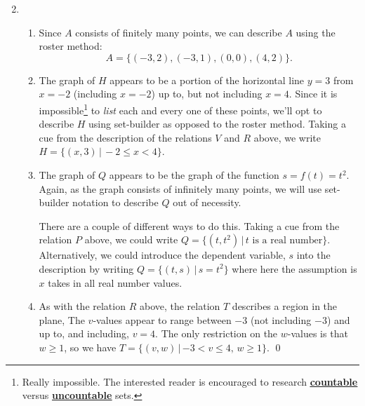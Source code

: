 \documentclass{ximera}
\begin{document}
\begin{example}
\begin{enumerate}
\begin{enumerate}
\begin{multicols}{2}
\end{multicols}

\end{enumerate}

\item  \begin{enumerate}

\item  Since $A$ consists of finitely many points, we can describe $A$ using the roster method:  \[A = \{ (-3,2), (-3,1), (0,0), (4,2) \}.\]

\item  The graph of $H$ appears to be a portion of the horizontal line $y=3$ from $x = -2$ (including $x = -2$) up to, but not including $x=4$.  Since it is impossible\footnote{Really impossible.  The interested reader is encouraged to research \href{http://en.wikipedia.org/wiki/Countable_set}{\underline{\textbf{countable}}} versus \href{http://en.wikipedia.org/wiki/Uncountable_set}{\underline{\textbf{uncountable}}} sets.}  to \textit{list} each and every one of these points, we'll opt to describe $H$ using set-builder as opposed to the roster method.  Taking a cue from the description of the relations $V$ and $R$ above, we write  $H = \{ (x, 3) \, | \, -2 \leq x < 4 \}$.


\item  The graph of $Q$ appears to be the graph of the function $s = f(t) = t^2$.  Again, as the graph consists of infinitely many points, we will use set-builder notation to describe $Q$ out of necessity.  

\smallskip

There are a couple of different ways to do this.  Taking a cue from the relation $P$ above, we could write $Q = \{ (t, t^2) \, | \, \text{$t$ is a real number} \}$.  Alternatively, we could introduce the dependent variable, $s$ into the description by  writing  $Q = \{ (t, s) \, | \, s = t^2 \}$ where here the assumption is $x$ takes in all real number values.


\item  As with the relation $R$ above, the relation $T$ describes a region in the plane,  The $v$-values appear to range between $-3$ (not including $-3$) and up to, and including, $v = 4$.  The only restriction on the $w$-values is that $w \geq 1$, so we have $T = \{ (v, w) \, | \, \text{$-3 < v \leq 4$, $w \geq 1$} \}$. \qed

\end{enumerate}

\end{enumerate}

\end{example}
\end{document}
